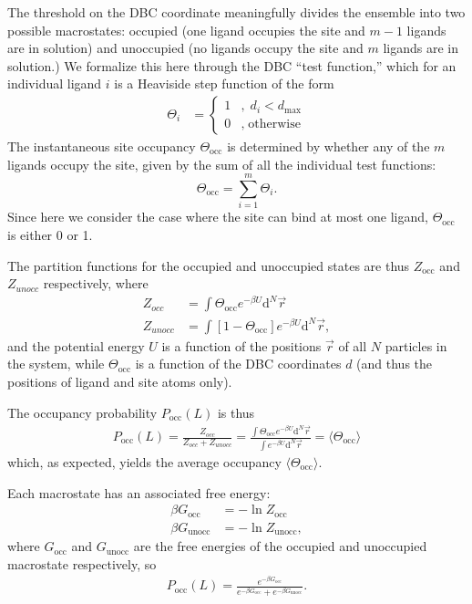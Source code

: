 \documentclass[9pt,tutorial]{Styling/livecoms}
\begin{document}
The threshold on the DBC coordinate meaningfully divides the ensemble into two possible macrostates: occupied (one ligand occupies the site and $m-1$ ligands are in solution) and unoccupied (no ligands occupy the site and $m$ ligands are in solution.)  We formalize this here through the DBC ``test function,'' which for an individual ligand $i$ is a Heaviside step function  of the form 
\begin{align} 
   \Theta_i &= \begin{cases}
        1 &, \; d_{i} < d_\mathrm{max}\\
        0 &, \; \text{otherwise}
    \end{cases}
\end{align}
The instantaneous site occupancy $\Theta_\mathrm{occ}$ is determined by whether any of the $m$ ligands occupy the site, given by the sum of all the individual test functions:
\begin{equation}
   \Theta_\mathrm{occ}=\sum_{i=1}^m\Theta_i. 
\end{equation}
Since here we consider the case where the site can bind at most one ligand, $\Theta_\mathrm{occ}$ is either 0 or 1.  

The  partition functions for the occupied and unoccupied states are thus $Z_\mathrm{occ}$ and $Z_{unocc}$ respectively, where 
\begin{align}
    Z_{occ} &=\int \Theta_\mathrm{occ}e^{-\beta U} \mathrm{d}^N\vec{r}\\ 
    Z_{unocc} &= \int \left[1-\Theta_\mathrm{occ}\right]e^{-\beta U} \mathrm{d}^N\vec{r} , 
\end{align}
and the potential energy $U$ is a function of the positions $\vec{r}$ of all $N$ particles in the system, while $\Theta_\mathrm{occ}$ is a function of the DBC coordinates $d$ (and thus the positions of ligand and site atoms only).  

The occupancy probability $P_\mathrm{occ}(L)$ is thus  
\begin{align}\label{eq:probability1.5}
    P_\mathrm{occ}(L)=\frac{Z_{occ}} {Z_{occ} + Z_{unocc}}=\frac{\int \Theta_\mathrm{occ} e^{-\beta U} \mathrm{d}^N\vec{r}} {\int e^{-\beta U}\mathrm{d}^N\vec{r}}=\langle \Theta_\mathrm{occ}\rangle
\end{align} 
which, as expected, yields the average occupancy $\langle \Theta_\mathrm{occ}\rangle$.  

Each macrostate has an associated free energy: 
\begin{align}
    \beta G_\mathrm{occ}&=-\ln Z_\mathrm{occ}\\
    \beta G_\mathrm{unocc}&=-\ln Z_\mathrm{unocc},
\end{align}
where $G_\mathrm{occ}$ and $G_\mathrm{unocc}$ are the free energies of the occupied and unoccupied macrostate respectively, so 
\begin{align}
    P_\mathrm{occ}(L)=\frac{e^{-\beta G_\mathrm{occ}}} {e^{-\beta G_\mathrm{occ}} + e^{-\beta G_\mathrm{unocc}}}.\label{eq:ApE:probability2}
\end{align}
\end{document}
